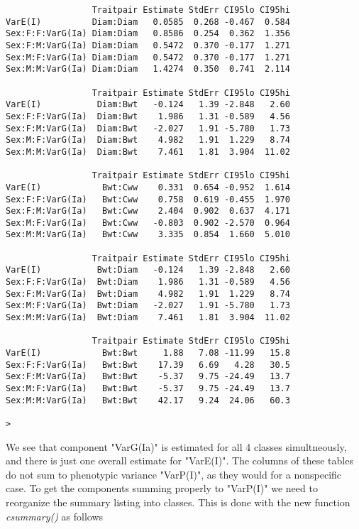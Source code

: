 \documentclass[titlepage]{article}  %
\begin{document}
\begin{verbatim}
                 Traitpair Estimate StdErr CI95lo CI95hi
VarE(I)          Diam:Diam   0.0585  0.268 -0.467  0.584
Sex:F:F:VarG(Ia) Diam:Diam   0.8586  0.254  0.362  1.356
Sex:F:M:VarG(Ia) Diam:Diam   0.5472  0.370 -0.177  1.271
Sex:M:F:VarG(Ia) Diam:Diam   0.5472  0.370 -0.177  1.271
Sex:M:M:VarG(Ia) Diam:Diam   1.4274  0.350  0.741  2.114

                 Traitpair Estimate StdErr CI95lo CI95hi
VarE(I)           Diam:Bwt   -0.124   1.39 -2.848   2.60
Sex:F:F:VarG(Ia)  Diam:Bwt    1.986   1.31 -0.589   4.56
Sex:F:M:VarG(Ia)  Diam:Bwt   -2.027   1.91 -5.780   1.73
Sex:M:F:VarG(Ia)  Diam:Bwt    4.982   1.91  1.229   8.74
Sex:M:M:VarG(Ia)  Diam:Bwt    7.461   1.81  3.904  11.02

                 Traitpair Estimate StdErr CI95lo CI95hi
VarE(I)            Bwt:Cww    0.331  0.654 -0.952  1.614
Sex:F:F:VarG(Ia)   Bwt:Cww    0.758  0.619 -0.455  1.970
Sex:F:M:VarG(Ia)   Bwt:Cww    2.404  0.902  0.637  4.171
Sex:M:F:VarG(Ia)   Bwt:Cww   -0.803  0.902 -2.570  0.964
Sex:M:M:VarG(Ia)   Bwt:Cww    3.335  0.854  1.660  5.010

                 Traitpair Estimate StdErr CI95lo CI95hi
VarE(I)           Bwt:Diam   -0.124   1.39 -2.848   2.60
Sex:F:F:VarG(Ia)  Bwt:Diam    1.986   1.31 -0.589   4.56
Sex:F:M:VarG(Ia)  Bwt:Diam    4.982   1.91  1.229   8.74
Sex:M:F:VarG(Ia)  Bwt:Diam   -2.027   1.91 -5.780   1.73
Sex:M:M:VarG(Ia)  Bwt:Diam    7.461   1.81  3.904  11.02

                 Traitpair Estimate StdErr CI95lo CI95hi
VarE(I)            Bwt:Bwt     1.88   7.08 -11.99   15.8
Sex:F:F:VarG(Ia)   Bwt:Bwt    17.39   6.69   4.28   30.5
Sex:F:M:VarG(Ia)   Bwt:Bwt    -5.37   9.75 -24.49   13.7
Sex:M:F:VarG(Ia)   Bwt:Bwt    -5.37   9.75 -24.49   13.7
Sex:M:M:VarG(Ia)   Bwt:Bwt    42.17   9.24  24.06   60.3

> 
\end{verbatim}
 We see that component "VarG(Ia)" is estimated for all 4 classes simultneously, and there is just one overall estimate for "VarE(I)". The columns of these tables do not sum to phenotypic variance "VarP(I)", as they would for a nonspecific case. To get the components summing properly to "VarP(I)" we need to reorganize the summary listing into classes. This is done with the new function {\em csummary()} as follows
\end{document}
